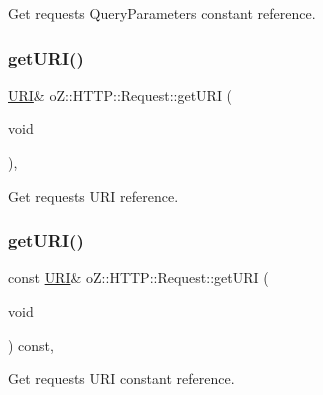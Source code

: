 Get request\textquotesingle{}s Query\+Parameters constant reference. 

\mbox{\label{classo_z_1_1_h_t_t_p_1_1_request_aaec3f19cb4ee6a18878166049df3253a}} 
\subsubsection{\texorpdfstring{getURI()}{getURI()}\hspace{0.1cm}{\footnotesize\ttfamily [1/2]}}
{\footnotesize\ttfamily \mbox{\hyperlink{namespaceo_z_1_1_h_t_t_p_a6d47156e2eac27750983fc1b54bd2ff8}{U\+RI}}\& o\+Z\+::\+H\+T\+T\+P\+::\+Request\+::get\+U\+RI (\begin{DoxyParamCaption}\item[{void}]{ }\end{DoxyParamCaption})\hspace{0.3cm}{\ttfamily [inline]}, {\ttfamily [noexcept]}}



Get request\textquotesingle{}s U\+RI reference. 

\mbox{\label{classo_z_1_1_h_t_t_p_1_1_request_afe1db07c464e1b708187108cbef952fa}} 
\subsubsection{\texorpdfstring{getURI()}{getURI()}\hspace{0.1cm}{\footnotesize\ttfamily [2/2]}}
{\footnotesize\ttfamily const \mbox{\hyperlink{namespaceo_z_1_1_h_t_t_p_a6d47156e2eac27750983fc1b54bd2ff8}{U\+RI}}\& o\+Z\+::\+H\+T\+T\+P\+::\+Request\+::get\+U\+RI (\begin{DoxyParamCaption}\item[{void}]{ }\end{DoxyParamCaption}) const\hspace{0.3cm}{\ttfamily [inline]}, {\ttfamily [noexcept]}}



Get request\textquotesingle{}s U\+RI constant reference. 

\mbox{\label{classo_z_1_1_h_t_t_p_1_1_request_ad38f30d48f4d3f201380ac1e73b26fc8}} 
